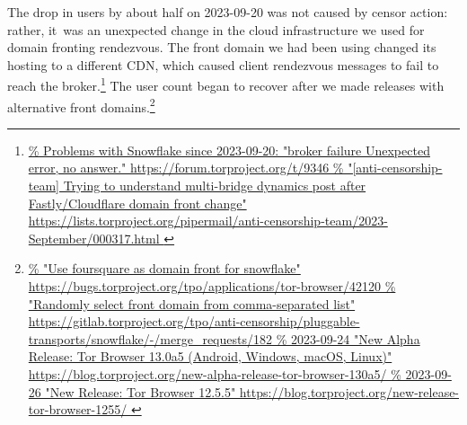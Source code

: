 \documentclass[letterpaper,twocolumn]{article}
\newlength{\urlfootnotesize}
\newcommand{\urlfootnote}[1]{\footnote{
\raggedright\fontsize{\urlfootnotesize}{\urlfootnotesize}\selectfont\url{#1}
}}
\begin{document}
The drop in users by about half on \mbox{2023-09-20}
was not caused by censor action:
rather, it~was an unexpected change in the cloud
infrastructure we used for domain fronting rendezvous.
The front domain we had been using
changed its hosting to a different CDN,
which caused client rendezvous messages to fail to reach the broker.\urlfootnote{
https://forum.torproject.org/t/9346
}
The user count began
to recover after we made releases
with alternative front domains.\urlfootnote{
https://bugs.torproject.org/tpo/applications/tor-browser/42120
}
\end{document}
